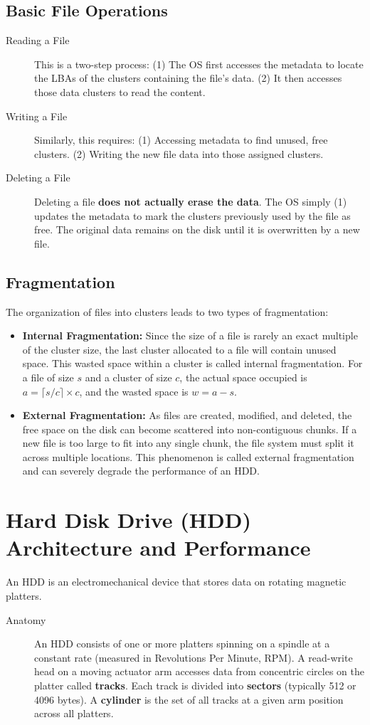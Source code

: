 \subsection{Basic File Operations}
\begin{description}
    \item[Reading a File] This is a two-step process: (1) The OS first accesses the metadata to locate the LBAs of the clusters containing the file's data. (2) It then accesses those data clusters to read the content.
    \item[Writing a File] Similarly, this requires: (1) Accessing metadata to find unused, free clusters. (2) Writing the new file data into those assigned clusters.
    \item[Deleting a File] Deleting a file \textbf{does not actually erase the data}. The OS simply (1) updates the metadata to mark the clusters previously used by the file as free. The original data remains on the disk until it is overwritten by a new file.
\end{description}

\subsection{Fragmentation}
The organization of files into clusters leads to two types of fragmentation:
\begin{itemize}
    \item \textbf{Internal Fragmentation:} Since the size of a file is rarely an exact multiple of the cluster size, the last cluster allocated to a file will contain unused space. This wasted space within a cluster is called internal fragmentation. For a file of size $s$ and a cluster of size $c$, the actual space occupied is $a = \lceil s/c \rceil \times c$, and the wasted space is $w = a - s$.
    \item \textbf{External Fragmentation:} As files are created, modified, and deleted, the free space on the disk can become scattered into non-contiguous chunks. If a new file is too large to fit into any single chunk, the file system must split it across multiple locations. This phenomenon is called external fragmentation and can severely degrade the performance of an HDD.
\end{itemize}

\section{Hard Disk Drive (HDD) Architecture and Performance}
An HDD is an electromechanical device that stores data on rotating magnetic platters.
\begin{description}
    \item[Anatomy] An HDD consists of one or more platters spinning on a spindle at a constant rate (measured in Revolutions Per Minute, RPM). A read-write head on a moving actuator arm accesses data from concentric circles on the platter called \textbf{tracks}. Each track is divided into \textbf{sectors} (typically 512 or 4096 bytes). A \textbf{cylinder} is the set of all tracks at a given arm position across all platters.
\end{description}

